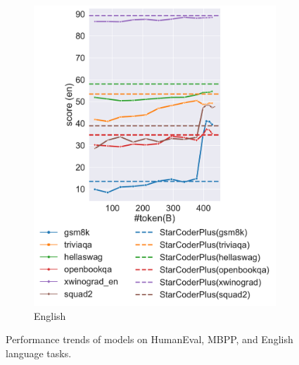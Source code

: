 \begin{figure}[t]
\begin{subfigure}{0.33\textwidth}
        \includegraphics[width=\textwidth]{fig/aurora-m-en-fixed-optimal.pdf}
        \caption{English}
        \label{fig:trend-en}
    \end{subfigure}
    \caption{Performance trends of models on HumanEval, MBPP, and English language tasks.}
    \label{fig:ana-code-en}
\end{figure}

